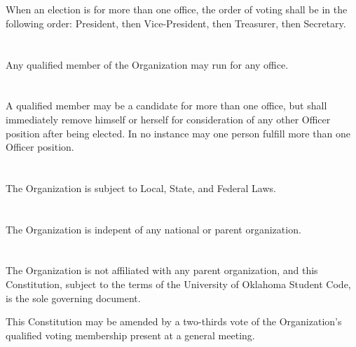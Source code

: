 \documentclass[12pt]{cls/constitution}
\begin{document}
\section{}
When an election is for more than one office, the order of voting shall be in the following order: President, then Vice-President, then Treasurer, then Secretary.

\section{}
Any qualified member of the Organization may run for any office. 

\section{}
A qualified member may be a candidate for more than one office, but shall immediately remove himself or herself for consideration of any other Officer position after being elected. In no instance may one person fulfill more than one Officer position. 


\section{}
The Organization is  subject to Local, State, and Federal Laws.

\section{}
The Organization is indepent of any national or
parent organization.

\section{}
The Organization is not affiliated with any parent organization, and this Constitution, subject to the terms of the University of Oklahoma Student Code, is the sole governing document.

This Constitution may be amended by a two-thirds vote of the Organization’s qualified voting membership present at a general meeting. 
\end{document}
